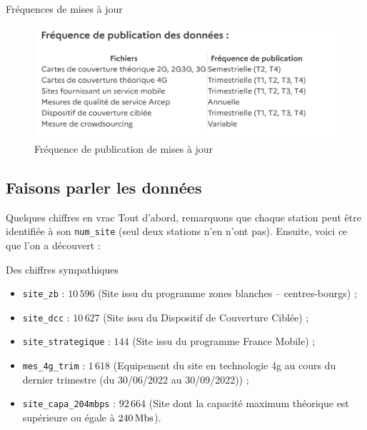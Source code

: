 \begin{frame}{Fréquences de mises à jour}
    \begin{figure}
        \includegraphics[height=0.5\paperheight]{images/frequence.png}
        \caption{\label{fig:freq}Fréquence de publication de mises à jour}
    \end{figure}
\end{frame}


\subsection{Faisons parler les données}
\insertsubsectionframe

\begin{frame}{Quelques chiffres en vrac}
    Tout d'abord, remarquons que chaque station peut être identifiée à son \texttt{num\_site} (seul deux stations n'en n'ont pas).
    Ensuite, voici ce que l'on a découvert :
    \begin{block}{Des chiffres sympathiques}
        \begin{itemize}
            \item \texttt{site\_zb} : $10\,596$ (Site issu du programme \og zones blanches – centres-bourgs\fg{}) ;
            \item \texttt{site\_dcc} : $10\,627$ (Site issu du \og Dispositif de Couverture Ciblée\fg{}) ;
            \item \texttt{site\_strategique} : $144$ (Site issu du programme \og France Mobile\fg{}) ;
            \item \texttt{mes\_4g\_trim} : $1\,618$ (Equipement du site en technologie 4g au cours du dernier trimestre (du 30/06/2022 au 30/09/2022)) ;
            \item \texttt{site\_capa\_204mbps} : $92\,664$ (Site dont la capacité maximum théorique est supérieure ou égale à $\unit[240]{Mbs}$).
        \end{itemize}
    \end{block}
\end{frame}

